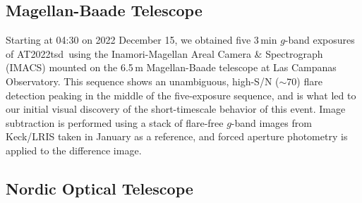 \documentclass{nature_plusfigure}
\newcommand{\at}{AT2022tsd}
\begin{document}
\begin{methods}

\subsection{Magellan-Baade Telescope}
\label{sec:magellan}

Starting at 04:30 on 2022 December 15, we obtained five 3\,min $g$-band exposures of \at\ using the Inamori-Magellan Areal Camera \& Spectrograph (IMACS\cite{Dressler2011}) mounted on the 6.5\,m Magellan-Baade telescope at Las Campanas Observatory.  This sequence shows an unambiguous, high-S/N ($\sim 70$) flare detection peaking in the middle of the five-exposure sequence, and is what led to our initial visual discovery of the short-timescale behavior of this event.  Image subtraction is performed using a stack of flare-free $g$-band images from Keck/LRIS taken in January as a reference, and forced aperture photometry is applied to the difference image.

\subsection{Nordic Optical Telescope}
\label{sec:not}


\end{methods}
\end{document}

